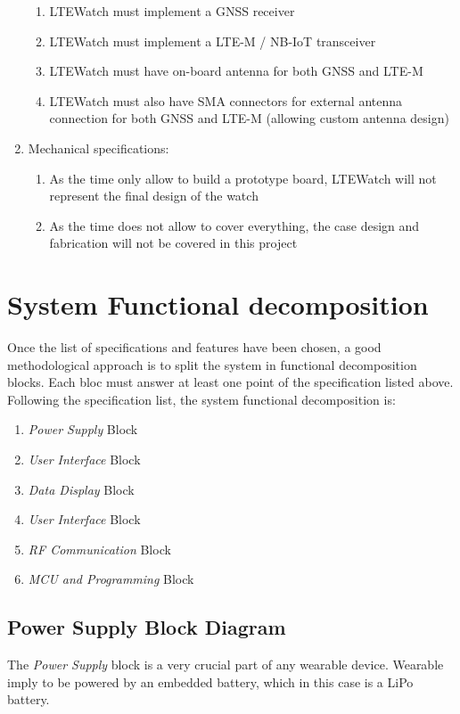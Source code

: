 \documentclass[report.tex]{subfiles}
\begin{document}
\begin{enumerate}
\begin{enumerate}
	\item LTEWatch must implement a GNSS receiver
	\item LTEWatch must implement a LTE-M / NB-IoT transceiver
	\item LTEWatch must have on-board antenna for both GNSS and LTE-M
	\item LTEWatch must also have SMA connectors for external antenna connection for both GNSS and LTE-M (allowing custom antenna design)
\end{enumerate}
\item Mechanical specifications:
\begin{enumerate}
	\item As the time only allow to build a prototype board, LTEWatch will not represent the final design of the watch
	\item As the time does not allow to cover everything, the case design and fabrication will not be covered in this project
\end{enumerate}
\end{enumerate}

\section{System Functional decomposition} \label{sec:sys_func_dec}
Once the list of specifications and features have been chosen, a good methodological approach is to split the system in functional decomposition blocks. Each bloc must answer at least one point of the specification listed above.\\

Following the specification list, the system functional decomposition is:
\begin{enumerate}
\item \textit{Power Supply} Block
\item \textit{User Interface} Block
\item \textit{Data Display} Block
\item \textit{User Interface} Block
\item \textit{RF Communication} Block
\item \textit{MCU and Programming} Block
\end{enumerate}

\subsection{Power Supply Block Diagram} \label{sec:pwr_blk_dgr}
The \textit{Power Supply} block is a very crucial part of any wearable device. Wearable imply to be powered by an embedded battery, which in this case is a LiPo battery.\\
\end{document}
